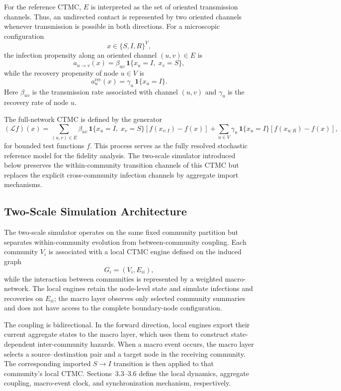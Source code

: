 \documentclass[a4paper,fleqn]{cas-sc}
\begin{document}
For the reference CTMC, $E$ is interpreted as the set of oriented transmission channels. Thus, an undirected contact is represented by two oriented channels whenever transmission is possible in both directions. For a microscopic configuration
\[
x\in\{S,I,R\}^{V},
\]
the infection propensity along an oriented channel $(u,v)\in E$ is
\[
a_{u\rightarrow v}(x)
=
\beta_{uv}\,
\mathbf{1}\{x_u=I,\;x_v=S\},
\]
while the recovery propensity of node $u\in V$ is
\[
a_u^{\mathrm{rec}}(x)
=
\gamma_u\,
\mathbf{1}\{x_u=I\}.
\]
Here $\beta_{uv}$ is the transmission rate associated with channel $(u,v)$ and $\gamma_u$ is the recovery rate of node $u$.

The full-network CTMC is defined by the generator
\[
(\mathcal{L}f)(x)
=
\sum_{(u,v)\in E}
\beta_{uv}\,
\mathbf{1}\{x_u=I,\;x_v=S\}
\left[
f(x_{v:I})-f(x)
\right]
+
\sum_{u\in V}
\gamma_u\,
\mathbf{1}\{x_u=I\}
\left[
f(x_{u:R})-f(x)
\right],
\]
for bounded test functions $f$. This process serves as the fully resolved stochastic reference model for the fidelity analysis. The two-scale simulator introduced below preserves the within-community transition channels of this CTMC but replaces the explicit cross-community infection channels by aggregate import mechanisms.


\subsection{Two-Scale Simulation Architecture}

The two-scale simulator operates on the same fixed community partition but separates within-community evolution from between-community coupling. Each community $V_i$ is associated with a local CTMC engine defined on the induced graph
\[
G_i=(V_i,E_{ii}),
\]
while the interaction between communities is represented by a weighted macro-network. The local engines retain the node-level state and simulate infections and recoveries on $E_{ii}$; the macro layer observes only selected community summaries and does not have access to the complete boundary-node configuration.

The coupling is bidirectional. In the forward direction, local engines export their current aggregate states to the macro layer, which uses them to construct state-dependent inter-community hazards. When a macro event occurs, the macro layer selects a source--destination pair and a target node in the receiving community. The corresponding imported $S\rightarrow I$ transition is then applied to that community's local CTMC. Sections~3.3--3.6 define the local dynamics, aggregate coupling, macro-event clock, and synchronization mechanism, respectively.
\end{document}
